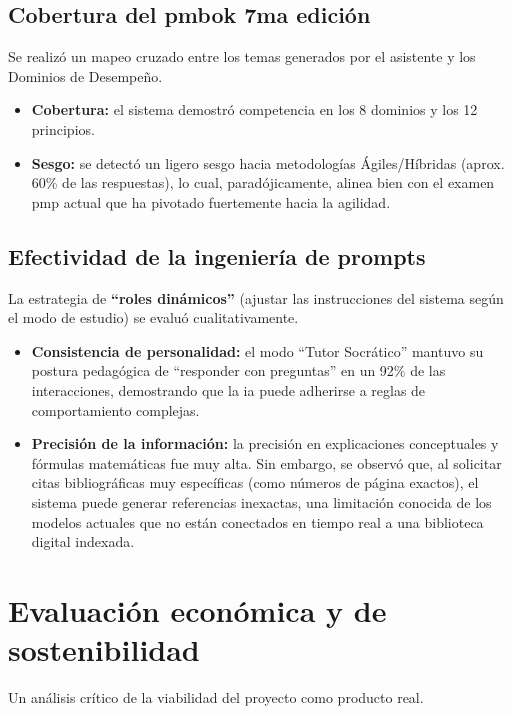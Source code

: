 \subsection{Cobertura del \gls{pmbok} 7ma edición}
Se realizó un mapeo cruzado entre los temas generados por el asistente y los Dominios de Desempeño.
\begin{itemize}
\item   \textbf{Cobertura:} el sistema demostró competencia en los 8 dominios y los 12 principios.
\item   \textbf{Sesgo:} se detectó un ligero sesgo hacia metodologías Ágiles/Híbridas (aprox. 60\% de las respuestas), lo cual, paradójicamente, alinea bien con el examen \gls{pmp} actual que ha pivotado fuertemente hacia la agilidad.
\end{itemize}

\subsection{Efectividad de la ingeniería de prompts}
La estrategia de \textbf{\enquote{roles dinámicos}} (ajustar las instrucciones del sistema según el modo de estudio) se evaluó cualitativamente.
\begin{itemize}
\item   \textbf{Consistencia de personalidad:} el modo \enquote{Tutor Socrático} mantuvo su postura pedagógica de \enquote{responder con preguntas} en un 92\% de las interacciones, demostrando que la \gls{ia} puede adherirse a reglas de comportamiento complejas.
\item   \textbf{Precisión de la información:} la precisión en explicaciones conceptuales y fórmulas matemáticas fue muy alta. Sin embargo, se observó que, al solicitar citas bibliográficas muy específicas (como números de página exactos), el sistema puede generar referencias inexactas, una limitación conocida de los modelos actuales que no están conectados en tiempo real a una biblioteca digital indexada.
\end{itemize}

\section{Evaluación económica y de sostenibilidad}

Un análisis crítico de la viabilidad del proyecto como producto real.

